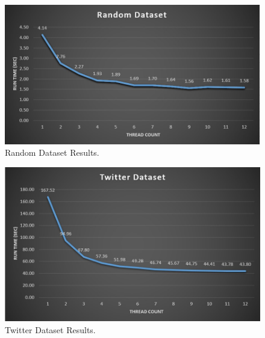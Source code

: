 \documentclass{article}
\begin{document}
\begin{figure}
  \includegraphics[width=\linewidth]{Figure8.jpg}
  \caption{Random Dataset Results.}
  \label{fig:Random}
\end{figure}

\begin{figure}
  \includegraphics[width=\linewidth]{Figure9.jpg}
  \caption{Twitter Dataset Results.}
  \label{fig:Twitter}
\end{figure}
\end{document}

